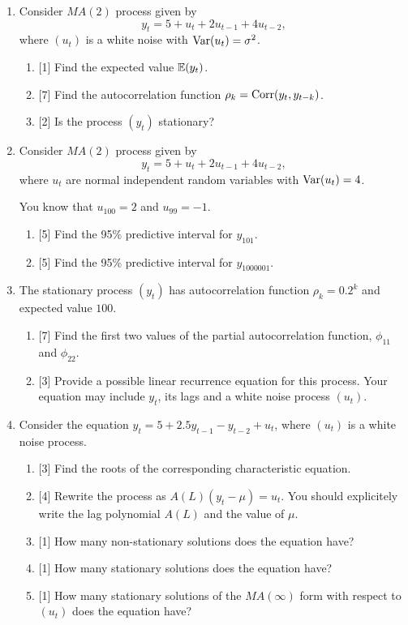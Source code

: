 \begin{enumerate}

\item Consider $MA(2)$ process given by 
\[
y_t = 5 + u_t + 2u_{t-1} + 4 u_{t-2},
\]
where $(u_t)$ is a white noise with $\operatorname{Var}(u_t) = \sigma^2$.

\begin{enumerate}
\item {[1]} Find the expected value $\operatorname{\mathbb{E}}(y_t)$.
\item {[7]} Find the autocorrelation function $\rho_k = \operatorname{Corr}(y_t, y_{t-k})$.
\item {[2]} Is the process $(y_t)$ stationary?
\end{enumerate}

\item Consider $MA(2)$ process given by 
\[
y_t = 5 + u_t + 2u_{t-1} + 4 u_{t-2},
\]
where $u_t$ are normal independent random variables with $\operatorname{Var}(u_t) = 4$.

You know that $u_{100} = 2$ and $u_{99} = -1$.

\begin{enumerate}
\item {[5]} Find the 95\% predictive interval for $y_{101}$.
\item {[5]} Find the 95\% predictive interval for $y_{1000001}$.
\end{enumerate}

\item The stationary process $(y_t)$ has autocorrelation function $\rho_k = 0.2^k$ and expected value $100$.
\begin{enumerate}
\item {[7]} Find the first two values of the partial autocorrelation function, $\phi_{11}$ and $\phi_{22}$.
\item {[3]} Provide a possible linear recurrence equation for this process. 
Your equation may include $y_t$, its lags and a white noise process $(u_t)$.
\end{enumerate}

\item Consider the equation $y_t = 5 + 2.5 y_{t-1} - y_{t-2} + u_t$, where $(u_t)$ is a white noise process. 
\begin{enumerate}
\item {[3]} Find the roots of the corresponding characteristic equation. 
\item {[4]} Rewrite the process as $A(L)(y_t - \mu) = u_t$. 
You should explicitely write the lag polynomial $A(L)$ and the value of $\mu$.
\item {[1]} How many non-stationary solutions does the equation have?
\item {[1]} How many stationary solutions does the equation have?
\item {[1]} How many stationary solutions of the $MA(\infty)$ form with respect to $(u_t)$ does the equation have?
\end{enumerate}


\end{enumerate}
